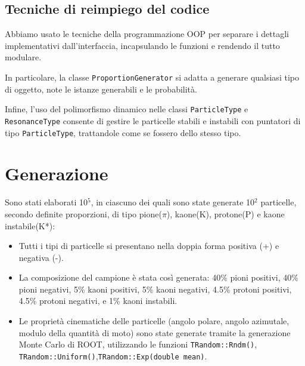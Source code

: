 \documentclass[12pt, a4paper]{article}
\begin{document}
\subsection{Tecniche di reimpiego del codice}
Abbiamo usato le tecniche della programmazione OOP per separare i dettagli implementativi dall'interfaccia, incapsulando le funzioni e rendendo il tutto modulare.
\newline

In particolare, la classe \verb!ProportionGenerator! si adatta a generare qualsiasi tipo di oggetto, note le istanze generabili e le probabilità.
\newline

Infine, l'uso del polimorfismo dinamico nelle classi \verb!ParticleType! e \verb!ResonanceType! consente di gestire le particelle stabili e instabili con puntatori di tipo \verb!ParticleType!, trattandole come se fossero dello stesso tipo.

\section{Generazione}

Sono stati elaborati 10$^5$, in ciascuno dei quali sono state generate 10$^2$ particelle, secondo definite proporzioni, di tipo pione($\pi$), kaone(K), protone(P) e kaone instabile(K*):

\begin{itemize}

\item Tutti i tipi di particelle si presentano nella doppia forma positiva (+) e negativa (-). 

\item La composizione del campione è stata così generata: 40\% pioni positivi, 40\% pioni negativi, 5\% kaoni positivi, 5\% kaoni negativi, 4.5\% protoni positivi, 4.5\% protoni negativi, e 1\% kaoni instabili.

\item Le proprietà cinematiche delle particelle (angolo polare, angolo azimutale, modulo della quantità di moto) sono state generate tramite la generazione Monte Carlo di ROOT, utilizzando le funzioni \verb!TRandom::Rndm()!, 
\verb!TRandom::Uniform()!,\verb!TRandom::Exp(double mean)!.

\end{itemize}
\end{document}
